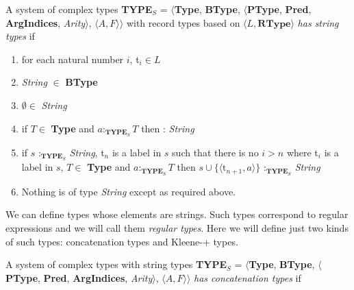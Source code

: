 A system of complex types  \textbf{TYPE}$_S$ = $\langle${\bf Type}, {\bf BType},
$\langle$\textbf{PType}, {\bf Pred}, \textbf{ArgIndices}, {\it
  Arity\/}$\rangle$, $\langle A,F\rangle$$\rangle$ with record types
based on $\langle L, \mathbf{RType}\rangle$ \textit{has string types}
if
\begin{enumerate} 
 
\item for each natural number $i$, t$_i\in L$
 
\item \textit{String} $\in$ \textbf{BType}

\item $\emptyset\in$ \textit{String}

\item if $T \in$ \textbf{Type} and $a:_{\mathbf{TYPE}_S}T$ then
   : \textit{String}

\item if $s$ :$_{\mathbf{TYPE}_S}$ \textit{String}, t$_n$ is a label in $s$ such that
  there is no $i>n$ where t$_i$ is a label in $s$, $T \in$ \textbf{Type}
  and $a:_{\mathbf{TYPE}_S}T$ then $s\cup\{\langle \mathrm{t}_{n+1},a\rangle\}$ :$_{\mathbf{TYPE}_S}$
  \textit{String}

\item Nothing is of type \textit{String} except as required above.
 
\end{enumerate} 
  
 
We can define types whose elements are strings.  Such types correspond
to regular expressions and we will call them \textit{regular types}.
Here we will define just two kinds of such types:  concatenation types
and Kleene-+ types.

A system of complex types with string types \textbf{TYPE}$_S$ = $\langle${\bf Type}, {\bf BType},
$\langle$\textbf{PType}, {\bf Pred}, \textbf{ArgIndices}, {\it
  Arity\/}$\rangle$, $\langle A,F\rangle$$\rangle$ \textit{has
  concatenation types} if 
 
